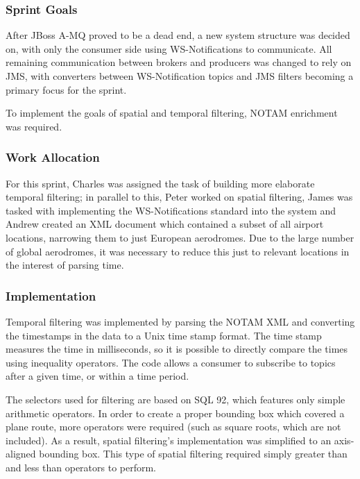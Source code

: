 \documentclass[a4paper, 12pt, twoside]{article}
\begin{document}
\subsubsection{Sprint Goals}

After JBoss A-MQ proved to be a dead end, a new system structure was decided on, with only the consumer side using WS-Notifications to communicate. All remaining communication between brokers and producers was changed to rely on JMS, with converters between WS-Notification topics and JMS filters becoming a primary focus for the sprint.

To implement the goals of spatial and temporal filtering, NOTAM enrichment was required.


\subsubsection{Work Allocation}

For this sprint, Charles was assigned the task of building more elaborate temporal filtering; in parallel to this, Peter worked on spatial filtering, James was tasked with implementing the WS-Notifications standard into the system and Andrew created an XML document which contained a subset of all airport locations, narrowing them to just European aerodromes. Due to the large number of global aerodromes, it was necessary to reduce this just to relevant locations in the interest of parsing time.

\subsubsection{Implementation}

Temporal filtering was implemented by parsing the NOTAM XML and converting the timestamps in the data to a Unix time stamp format. The time stamp measures the time in milliseconds, so it is possible to directly compare the times using inequality operators. The code allows a consumer to subscribe to topics after a given time, or within a time period.

The selectors used for filtering are based on SQL 92, which features only simple arithmetic operators. In order to create a proper bounding box which covered a plane route, more operators were required (such as square roots, which are not included). As a result, spatial filtering's implementation was simplified to an axis-aligned bounding box. This type of spatial filtering required simply greater than and less than operators to perform.
\end{document}

